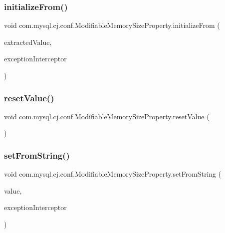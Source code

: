 \subsubsection{\texorpdfstring{initialize\+From()}{initializeFrom()}}
{\footnotesize\ttfamily void com.\+mysql.\+cj.\+conf.\+Modifiable\+Memory\+Size\+Property.\+initialize\+From (\begin{DoxyParamCaption}\item[{String}]{extracted\+Value,  }\item[{\mbox{\hyperlink{interfacecom_1_1mysql_1_1cj_1_1exceptions_1_1_exception_interceptor}{Exception\+Interceptor}}}]{exception\+Interceptor }\end{DoxyParamCaption})\hspace{0.3cm}{\ttfamily [protected]}}

\mbox{\label{classcom_1_1mysql_1_1cj_1_1conf_1_1_modifiable_memory_size_property_a2118b2d1d11e66304f167ab020efb64c}} 
\subsubsection{\texorpdfstring{reset\+Value()}{resetValue()}}
{\footnotesize\ttfamily void com.\+mysql.\+cj.\+conf.\+Modifiable\+Memory\+Size\+Property.\+reset\+Value (\begin{DoxyParamCaption}{ }\end{DoxyParamCaption})}

\mbox{\label{classcom_1_1mysql_1_1cj_1_1conf_1_1_modifiable_memory_size_property_afd540074a822236f5461b7a89ec49bd3}} 
\subsubsection{\texorpdfstring{set\+From\+String()}{setFromString()}}
{\footnotesize\ttfamily void com.\+mysql.\+cj.\+conf.\+Modifiable\+Memory\+Size\+Property.\+set\+From\+String (\begin{DoxyParamCaption}\item[{String}]{value,  }\item[{\mbox{\hyperlink{interfacecom_1_1mysql_1_1cj_1_1exceptions_1_1_exception_interceptor}{Exception\+Interceptor}}}]{exception\+Interceptor }\end{DoxyParamCaption})}

